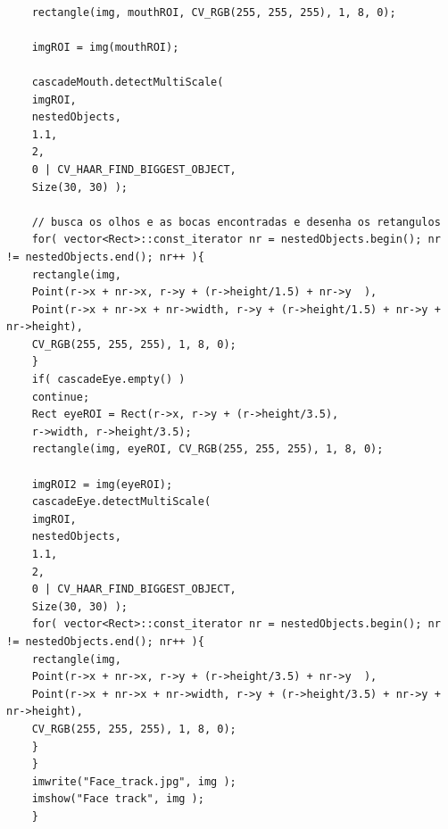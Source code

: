 \documentclass{article}
\begin{document}
\begin{lstlisting}
	
	rectangle(img, mouthROI, CV_RGB(255, 255, 255), 1, 8, 0);
	
	imgROI = img(mouthROI);
	
	cascadeMouth.detectMultiScale(
	imgROI,
	nestedObjects,
	1.1,
	2,
	0 | CV_HAAR_FIND_BIGGEST_OBJECT,
	Size(30, 30) );
	
	// busca os olhos e as bocas encontradas e desenha os retangulos
	for( vector<Rect>::const_iterator nr = nestedObjects.begin(); nr != nestedObjects.end(); nr++ ){
	rectangle(img,  
	Point(r->x + nr->x, r->y + (r->height/1.5) + nr->y  ),
	Point(r->x + nr->x + nr->width, r->y + (r->height/1.5) + nr->y + nr->height),  
	CV_RGB(255, 255, 255), 1, 8, 0);
	}
	if( cascadeEye.empty() )
	continue;
	Rect eyeROI = Rect(r->x, r->y + (r->height/3.5),
	r->width, r->height/3.5);
	rectangle(img, eyeROI, CV_RGB(255, 255, 255), 1, 8, 0);
	
	imgROI2 = img(eyeROI);
	cascadeEye.detectMultiScale(
	imgROI,
	nestedObjects,
	1.1,
	2,
	0 | CV_HAAR_FIND_BIGGEST_OBJECT,
	Size(30, 30) );
	for( vector<Rect>::const_iterator nr = nestedObjects.begin(); nr != nestedObjects.end(); nr++ ){
	rectangle(img,  
	Point(r->x + nr->x, r->y + (r->height/3.5) + nr->y  ),  
	Point(r->x + nr->x + nr->width, r->y + (r->height/3.5) + nr->y + nr->height),  
	CV_RGB(255, 255, 255), 1, 8, 0);
	}
	}
	imwrite("Face_track.jpg", img );
	imshow("Face track", img );
	}
	\end{lstlisting}	
\end{document}
